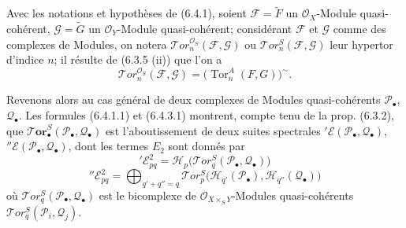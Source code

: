 \begin{env}[6.4.3]
Avec les notations et hypothèses de (6.4.1), soient
$\mathscr F=\widetilde F$ un $\mathscr O_X$-Module quasi-cohérent,
$\mathscr G=\widetilde G$ un $\mathscr O_Y$-Module quasi-cohérent;
considérant $\mathscr F$ et $\mathscr G$ comme des complexes de Modules, on
notera $\mathscr{T}\!or_n^{\mathscr O_S}(\mathscr F,\mathscr G)$ ou
$\mathscr{T}\!or_n^S(\mathscr F,\mathscr G)$ leur hypertor d'indice $n$; il
résulte de (6.3.5 (ii)) que l'on a
\[
  \mathscr{T}\!or_n^{\mathscr O_S}(\mathscr F,\mathscr G)
  =\bigl(\operatorname{Tor}_n^A(F,G)\bigr)^{\sim}.
  \tag{6.4.3.1}\label{III.6.4.3.1.fr}
\]

Revenons alors au cas général de deux complexes de Modules quasi-cohérents
$\mathscr P_\bullet$, $\mathscr Q_\bullet$. Les formules (6.4.1.1) et
(6.4.3.1) montrent, compte tenu de la prop. (6.3.2), que
$\boldsymbol{\mathscr{T}\!or}_\bullet^S(\mathscr P_\bullet,\mathscr Q_\bullet)$ est
l'aboutissement de deux suites spectrales
$'\mathscr E(\mathscr P_\bullet,\mathscr Q_\bullet)$,
$''\mathscr E(\mathscr P_\bullet,\mathscr Q_\bullet)$, dont les termes
$E_2$ sont donnés par
\[
  '\mathscr E_{pq}^2
  =\mathscr H_p\bigl(\mathscr{T}\!or_q^S
    (\mathscr P_\bullet,\mathscr Q_\bullet)\bigr)
  \tag{6.4.3.2}\label{III.6.4.3.2.fr}
\]
\[
  ''\mathscr E_{pq}^2
  =\bigoplus_{q'+q''=q}
  \mathscr{T}\!or_p^S
  \bigl(\mathscr H_{q'}(\mathscr P_\bullet),
        \mathscr H_{q''}(\mathscr Q_\bullet)\bigr)
  \tag{6.4.3.3}\label{III.6.4.3.3.fr}
\]
où $\mathscr{T}\!or_q^S(\mathscr P_\bullet,\mathscr Q_\bullet)$ est le
bicomplexe de $\mathscr O_{X\times_S Y}$-Modules quasi-cohérents
$\mathscr{T}\!or_q^S(\mathscr P_i,\mathscr Q_j)$.
\end{env}

